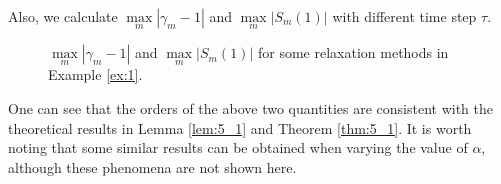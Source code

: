\documentclass[aspectratio=169]{beamer}
\begin{document}
	\begin{frame}\footnotesize
	Also, we calculate $\max\limits _m\left|\gamma_m-1\right|$ and $\max\limits _m\left|S_m(1)\right|$ with different time step $\tau$.
	\begin{figure}[H]
	  \begin{center}
	  \caption{$\max\limits_m\left|\gamma_m-1\right|$ and $\max\limits_m\left|S_m(1)\right|$ for some relaxation methods in Example \ref{ex:1}.}
	  \label{fig:1}
	  \end{center}
	  \end{figure}
	One can see that the orders of the above two quantities are consistent with the theoretical results in Lemma \ref{lem:5_1} and Theorem \ref{thm:5_1}.  It is worth noting that some similar results can be obtained when varying the value of $\alpha$, although these phenomena are not shown here.
	\end{frame}
	
\end{document}
